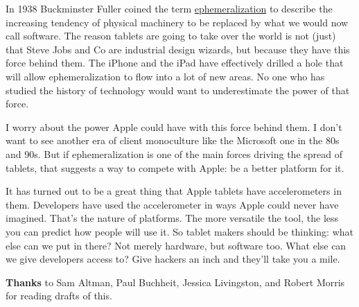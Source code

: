 In
                  1938 Buckminster Fuller coined the term
                  \href{http://en.wikipedia.org/wiki/Ephemeralization}{ephemeralization}
                  to describe the increasing tendency of physical machinery to
                  be replaced by what we would now call software. The reason
                  tablets are going to take over the world is not (just) that
                  Steve Jobs and Co are industrial design wizards, but because
                  they have this force behind them. The iPhone and the iPad have
                  effectively drilled a hole that will allow ephemeralization to
                  flow into a lot of new areas. No one who has studied the
                  history of technology would want to underestimate the power of
                  that force.

I worry about the power Apple could
                  have with this force behind them. I don't want to see another
                  era of client monoculture like the Microsoft one in the 80s
                  and 90s. But if ephemeralization is one of the main forces
                  driving the spread of tablets, that suggests a way to compete
                  with Apple: be a better platform for it.

It has
                  turned out to be a great thing that Apple tablets have
                  accelerometers in them. Developers have used the accelerometer
                  in ways Apple could never have imagined. That's the nature of
                  platforms. The more versatile the tool, the less you can
                  predict how people will use it. So tablet makers should be
                  thinking: what else can we put in there? Not merely hardware,
                  but software too. What else can we give developers access to?
                  Give hackers an inch and they'll take you a mile.








                  \textbf{Thanks} to Sam Altman, Paul Buchheit, Jessica
                  Livingston, and Robert Morris for reading drafts of this.




              
            
          
            
              
                


                  
              
            
          
